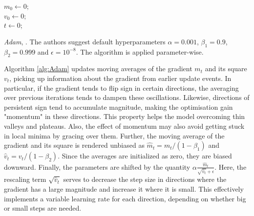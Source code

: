 \begin{algorithm}[H]\label{alg:Adam}
\SetAlgoLined

$m_0 \gets 0$;\\
$v_0 \gets 0$;\\
$t \gets 0$;\\
\caption{\emph{Adam}, \cite{kingma2017adam}. The authors suggest default hyperparameters $\alpha = 0.001$, $\beta_1 = 0.9$, $\beta_2 = 0.999$ and $\epsilon = 10^{-8}$. The algorithm is applied parameter-wise.}
\end{algorithm}

Algorithm \autoref{alg:Adam} updates moving averages of the gradient $m_t$ and its square $v_t$, picking up information about the gradient from earlier update events. In particular, if the gradient tends to flip sign in certain directions, the averaging over previous iterations tends to dampen these oscillations. Likewise, directions of persistent sign tend to accumulate magnitude, making the optimisation gain "momentum" in these directions. This property helps the model overcoming thin valleys and plateaus. Also, the effect of momentum may also avoid getting stuck in local minima by gracing over them. Further, the moving average of the gradient and its square is rendered unbiased as $\hat{m}_t = m_t/(1-\beta_1)$ and $\hat{v}_t = v_t/(1-\beta_2)$. Since the averages are initialized as zero, they are biased downward. Finally, the parameters are shifted by the quantity $\alpha \frac{\hat{m}_t}{\sqrt{\hat{v}_t} + \epsilon}$. Here, the rescaling term $\sqrt{\hat{v}_t}$ serves to decrease the step size in directions where the gradient has a large magnitude and increase it where it is small. This effectively implements a variable learning rate for each direction, depending on whether big or small steps are needed. 

